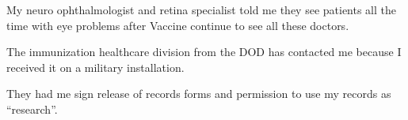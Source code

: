 {My neuro ophthalmologist and retina specialist told me they see patients all the
time with eye problems after Vaccine continue to see all these doctors.

The immunization healthcare division from the DOD has contacted me because I
received it on a military installation.

They had me sign release of records forms and permission to use my records as
“research”.

}
